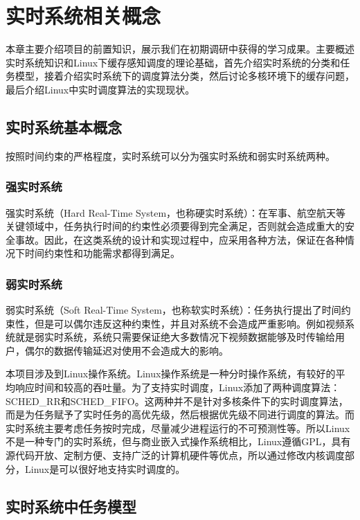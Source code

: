 

\section{实时系统相关概念} \label{sec:realtime}

本章主要介绍项目的前置知识，展示我们在初期调研中获得的学习成果。主要概述实时系统知识和Linux下缓存感知调度的理论基础，首先介绍实时系统的分类和任务模型，接着介绍实时系统下的调度算法分类，然后讨论多核环境下的缓存问题，最后介绍Linux中实时调度算法的实现现状。

\subsection{实时系统基本概念}

按照时间约束的严格程度，实时系统可以分为强实时系统和弱实时系统两种。

\subsubsection{强实时系统}

强实时系统（Hard Real-Time System，也称硬实时系统）：在军事、航空航天等关键领域中，任务执行时间的约束性必须要得到完全满足，否则就会造成重大的安全事故。因此，在这类系统的设计和实现过程中，应采用各种方法，保证在各种情况下时间约束性和功能需求都得到满足。

\subsubsection{弱实时系统}

弱实时系统（Soft Real-Time System，也称软实时系统）：任务执行提出了时间约束性，但是可以偶尔违反这种约束性，并且对系统不会造成严重影响。例如视频系统就是弱实时系统，系统只需要保证绝大多数情况下视频数据能够及时传输给用户，偶尔的数据传输延迟对使用不会造成大的影响。

本项目涉及到Linux操作系统。Linux操作系统是一种分时操作系统，有较好的平均响应时间和较高的吞吐量。为了支持实时调度，Linux添加了两种调度算法：SCHED\_RR和SCHED\_FIFO。这两种并不是针对多核条件下的实时调度算法，而是为任务赋予了实时任务的高优先级，然后根据优先级不同进行调度的算法。而实时系统主要考虑任务按时完成，尽量减少进程运行的不可预测性等。所以Linux不是一种专门的实时系统，但与商业嵌入式操作系统相比，Linux遵循GPL，具有源代码开放、定制方便、支持广泛的计算机硬件等优点，所以通过修改内核调度部分，Linux是可以很好地支持实时调度的。

\subsection{实时系统中任务模型}

